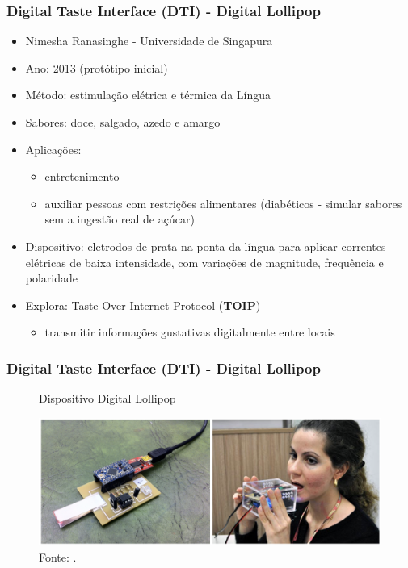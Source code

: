 \documentclass{beamer}
\begin{document}
\begin{frame}
  \frametitle{Digital Taste Interface (DTI) - Digital Lollipop}
  \begin{itemize}
    \item Nimesha Ranasinghe - Universidade de Singapura
    \item Ano: 2013 (protótipo inicial)
    \item Método: estimulação elétrica  e térmica da Língua
    \item Sabores: doce, salgado, azedo e amargo
    \item Aplicações:
    \begin{itemize}
      \item entretenimento
      \item auxiliar pessoas com restrições alimentares (diabéticos - simular sabores sem a ingestão real de açúcar)
    \end{itemize}
    \item Dispositivo: eletrodos de prata na ponta da língua para aplicar correntes elétricas de baixa intensidade, com variações de magnitude, frequência e polaridade
    \item Explora: Taste Over Internet Protocol (\textbf{TOIP})
    \begin{itemize}
      \item transmitir informações gustativas digitalmente entre locais
    \end{itemize}
  \end{itemize}
  \begin{flushright}
    \scriptsize
    \cite{ranasingheTongueMountedInterface2012}
    \cite{ranasingheVirtualTasteDigital2023}
  \end{flushright}
\end{frame}

\begin{frame}
  \frametitle{Digital Taste Interface (DTI) - Digital Lollipop}
  \begin{figure}[h]
    \centering
    \caption{Dispositivo Digital Lollipop}
    \vspace{-18pt}
    \includegraphics[width=1.03\textwidth]{img_DigitalLollipop.png}
    \vspace{-20pt}
    \caption*{Fonte: \cite{ranasingheDigitalLollipopStudying2016}.}
  \end{figure}
\end{frame}
\end{document}
